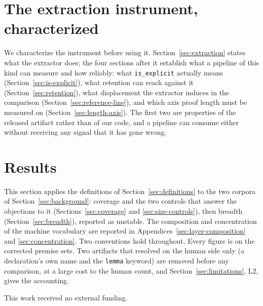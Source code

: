 \documentclass{article}
\begin{document}
\section{The extraction instrument, characterized}
\label{sec:instrument}
We characterize the instrument before using it.
Section~\ref{sec:extraction} states what the extractor does; the four sections
after it establish what a pipeline of this kind can measure and how reliably:
what \texttt{is\_explicit} actually means
(Section~\ref{sec:is-explicit}), what retention can reach against it
(Section~\ref{sec:retention}), what displacement the extractor induces in the
comparison (Section~\ref{sec:reference-line}), and which axis proof length
must be measured on (Section~\ref{sec:length-axis}). The first two are
properties of the released artifact rather than of our code, and a pipeline
can consume either without receiving any signal that it has gone wrong.













\section{Results}
\label{sec:results}
This section applies the definitions of Section~\ref{sec:definitions} to the
two corpora of Section~\ref{sec:background}: coverage and the two
controls that answer the objections to it
(Sections~\ref{sec:coverage} and \ref{sec:size-controls}), then
breadth (Section~\ref{sec:breadth}), reported as unstable. The composition and
concentration of the machine vocabulary are reported in
Appendices~\ref{sec:layer-composition} and \ref{sec:concentration}. Two conventions
hold throughout. Every figure is on the corrected premise sets. Two artifacts
that resolved on the human side only (a declaration's own name and the
\texttt{lemma} keyword) are removed before any comparison, at a large cost
to the human count, and Section~\ref{sec:limitations}, L2, gives the
accounting. 















\begin{ack}
This work received no external funding.
\end{ack}

{\small


}




\end{document}
